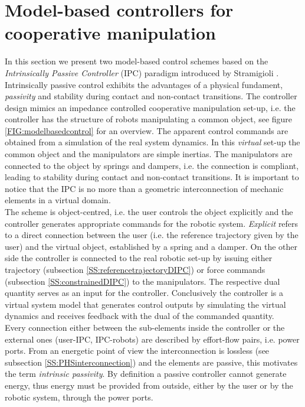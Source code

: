 \documentclass[a4paper,twoside, openright,12pt]{report}
\begin{document}
\section{Model-based controllers for cooperative manipulation}\label{S:modelbasedcontrol}
In this section we present two model-based control schemes based on the \emph{Intrinsically Passive Controller} (IPC) paradigm introduced by Stramigioli \cite{Stramigioli_01}. Intrinsically passive control exhibits the advantages of a physical fundament, \emph{passivity} and stability during contact and non-contact transitions. 
The controller design mimics an impedance controlled cooperative manipulation set-up, i.e. the controller has the structure of robots manipulating a common object, see figure \ref{FIG:modelbasedcontrol} for an overview. The apparent control commands are obtained from a simulation of the real system dynamics. In this \emph{virtual} set-up the common object and the manipulators are simple inertias. The manipulators are connected to the object by springs and dampers, i.e. the connection is compliant, leading to stability during contact and non-contact transitions. It is important to notice that the IPC is no more than a geometric interconnection of mechanic elements in a virtual domain.\\
 The scheme is object-centred, i.e. the user controls the object explicitly and the controller generates appropriate commands for the robotic system. \emph{Explicit} refers to a direct connection between the user (i.e. the reference trajectory given by the user) and the virtual object, established by a spring and a damper. On the other side the controller is connected to the real robotic set-up by issuing either trajectory (subsection \ref{SS:referencetrajectoryDIPC}) or force commands (subsection \ref{SS:constrainedDIPC}) to the manipulators. The respective dual quantity serves as an input for the controller. Conclusively the controller is a virtual system model that generates control outputs by simulating the virtual dynamics and receives feedback with the dual of the commanded quantity.\\
Every connection either between the sub-elements inside the controller or the external ones (user-IPC, IPC-robots) are described by effort-flow pairs, i.e. power ports. From an energetic point of view the interconnection is lossless (see subsection \ref{SS:PHSinterconnection}) and the elements are passive, this motivates the term \emph{intrinsic passivity}. By definition a passive controller cannot generate energy, thus energy must be provided from outside, either by the user or by the robotic system, through the power ports. 
\end{document}

